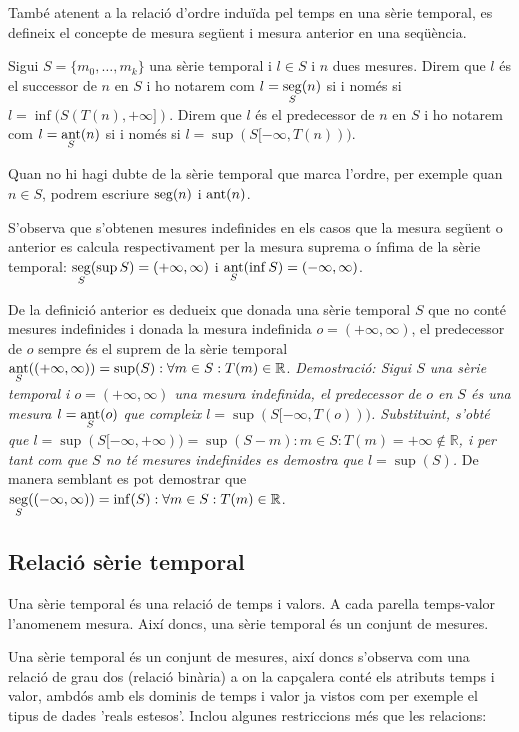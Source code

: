 També atenent a la relació d'ordre induïda pel temps en una sèrie temporal, es
defineix el concepte de mesura següent i mesura anterior en una
seqüència.

\begin{definition}
  Sigui $S=\{m_0, \ldots, m_k\}$ una sèrie temporal i $l\in S$ i $n$ dues
  mesures. Direm que $l$ és el successor de $n$ en $S$ i ho notarem
  com $l=\operatorname*{seg}\limits_S(n)$ si i només si $l=\inf(S(T(n),+\infty])$.
  Direm que $l$ és el predecessor de $n$ en $S$ i ho notarem com
  $l=\operatorname*{ant}\limits_S(n)$ si i només si $l=\sup(S[-\infty,T(n)))$.

Quan no hi hagi dubte de la sèrie temporal que marca l'ordre, per
exemple quan $n\in S$, podrem escriure $\operatorname*{seg}(n)$ i $\operatorname*{ant}(n)$.
\end{definition}
S'observa que s'obtenen mesures indefinides en els casos que la
mesura següent o anterior es calcula respectivament per la mesura
suprema o ínfima de la sèrie temporal: $\operatorname*{seg}\limits_S(\sup
S)=(+\infty,\infty)$ i $\operatorname*{ant}\limits_S(\inf S)=(-\infty,\infty)$.

De la definició anterior es dedueix que donada una sèrie temporal $S$
que no conté mesures indefinides i donada la mesura indefinida
$o=(+\infty,\infty)$, el predecessor de $o$ sempre és el suprem de la
sèrie temporal $\operatorname*{ant}\limits_S( (+\infty,\infty) ) = \sup(S): \forall
m\in S: T(m)\in\mathbb{R}$.  %
\emph{Demostració: Sigui $S$ una sèrie temporal i $o=(+\infty,\infty)$
  una mesura indefinida, el predecessor de $o$ en $S$ és una mesura
  $l=\operatorname*{ant}\limits_S(o)$ que compleix
  $l=\sup(S[-\infty,T(o)))$. Substituint, s'obté que
  $l=\sup(S[-\infty,+\infty))=\sup(S-m):m\in S:T(m)=+\infty \notin
  \mathbb{R}$, i per tant com que $S$ no té mesures indefinides es
  demostra que $l=\sup(S)$.  } De manera semblant es pot demostrar que
$\operatorname*{seg}\limits_S( (-\infty,\infty) ) = \inf(S): \forall m\in S:
T(m)\in\mathbb{R}$.




\subsection{Relació sèrie temporal}

Una sèrie temporal és una relació de temps i valors. A cada parella temps-valor l'anomenem mesura. Així doncs, una sèrie temporal és un conjunt de mesures.

Una sèrie temporal és un conjunt de mesures, així doncs s'observa com una relació de grau dos (relació binària)  a on la capçalera conté els atributs temps i valor, ambdós amb els dominis de temps i valor ja vistos com per exemple el tipus de dades 'reals estesos'. Inclou algunes restriccions més que les relacions:

